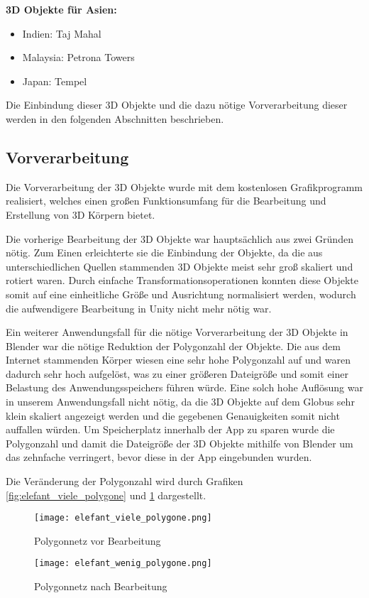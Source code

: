 \textbf{3D Objekte für Asien:}
\begin{itemize}
\item Indien: Taj Mahal
\item Malaysia: Petrona Towers
\item Japan: Tempel
\end{itemize}

Die Einbindung dieser 3D Objekte und die dazu nötige Vorverarbeitung dieser werden in den folgenden Abschnitten beschrieben.
\subsection{Vorverarbeitung}
Die Vorverarbeitung der 3D Objekte wurde mit dem kostenlosen Grafikprogramm  realisiert, welches einen großen Funktionsumfang für die Bearbeitung und Erstellung von 3D Körpern bietet. 

Die vorherige Bearbeitung der 3D Objekte war hauptsächlich aus zwei Gründen nötig. 
Zum Einen erleichterte sie die Einbindung der Objekte, da die aus unterschiedlichen Quellen stammenden 3D Objekte meist sehr groß skaliert und rotiert waren.
Durch einfache Transformationsoperationen konnten diese Objekte somit auf eine einheitliche Größe und Ausrichtung normalisiert werden, wodurch die aufwendigere Bearbeitung in Unity nicht mehr nötig war.

Ein weiterer Anwendungsfall für die nötige Vorverarbeitung der 3D Objekte in Blender war die nötige Reduktion der Polygonzahl der Objekte. 
Die aus dem Internet stammenden Körper wiesen eine sehr hohe Polygonzahl auf und waren dadurch sehr hoch aufgelöst, was zu einer größeren Dateigröße und somit einer Belastung des Anwendungsspeichers führen würde. 
Eine solch hohe Auflösung war in unserem Anwendungsfall nicht nötig, da die 3D Objekte auf dem Globus sehr klein skaliert angezeigt werden und die gegebenen Genauigkeiten somit nicht auffallen würden. 
Um Speicherplatz innerhalb der App zu sparen wurde die Polygonzahl und damit die Dateigröße der 3D Objekte mithilfe von Blender um das zehnfache verringert, bevor diese in der App eingebunden wurden.

Die Veränderung der Polygonzahl wird durch Grafiken \ref{fig:elefant_viele_polygone} und \ref{fig:elefant_wenig_polygone} dargestellt.

\begin{figure}[!htb]
  \texttt{[image: elefant\_viele\_polygone.png]}
  \caption{Polygonnetz vor Bearbeitung}\label{fig:elefant_viele_polygone}
\endminipage\hfill
{}
  \texttt{[image: elefant\_wenig\_polygone.png]}
  \caption{Polygonnetz nach Bearbeitung}\label{fig:elefant_wenig_polygone}
\endminipage\hfill
\end{figure}

